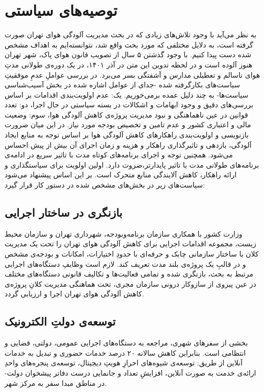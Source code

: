\documentclass[12pt]{atu}
\begin{document}
\section{توصیه‌های سیاستی}
به نظر می‌آید با وجود تلاش‌های زیادی که در بحث مدیریت آلودگی هوای تهران صورت گرفته است، به دلایل مختلفی که مورد بحث واقع شد، نتوانسته‌ایم به اهداف مشخص شده دست‌ پیدا کنیم. با وجود گذشتن ۵ سال از تصویب قانون هوای پاک، شهر تهران هنوز آلوده است و در لحظه تدوین این متن در آذر ۱۴۰۱، در یک دوره‌ی طولانی مدتِ هوای ناسالم و تعطیلی مدارس و آشفتگی بسر می‌برد. در بررسی عواملِ عدمِ موفقیتِ سیاست‌های بکارگرفته شده -جدای از عوامل اشاره شده در بخش آسیب‌شناسی سیاست‌ها- به چند دلیل عمده برمی‌خوریم. یک: عدم اولویت‌بندی اقدامات بر اساس بررسی‌های دقیق و وجود ابهامات و اشکالات در بسته‌ سیاستی در حال اجرا، دو:  تعدد قوانین در عین ناهماهنگی و نبود مدیریت پروژه‌ی کاهش آلودگی هوا، سوم: وضعیت مالی و اعتباری کشور و عدم تامین و تخصیص بودجه مورد نیاز.
در این میان ضرورت بازنویسی و اولویت‌بندی راهکارهای کاهش آلودگی هوا بر اساس توجه به  منابع ایجاد آلودگی، بازدهی و تاثیرگذاری راهکار و هزینه و زمان اجرای آن بیش از پیش احساس می‌شود. همچنین توجه و اجرای برنامه‌های کوتاه  مدت با تاثیر سریع در ادامه‌ی برنامه‌های طولانی مدت با تاثیر پایدارتر،ضروت دارد.
اولین اولویت برای سیاستگذاری و ارائه راهکار، کاهش آلایندگی منابع متحرک است.  بر این اساس پیشنهاد می‌شود سیاست‌های زیر در بخش‌های مشخص شده در دستور کار قرار گیرد:
\subsection{بازنگری در ساختار اجرایی}
وزارت کشور با همکاری سازمان برنامه‌و‌بودجه، شهرداری تهران و سازمان محیط زیست، مجموعه اقدامات اجرایی برای کاهش آلودگی هوای تهران را تحت یک مدیریت کلان با ساختار سازمانی چابک و حرفه‌ای با حدودِ اختیارات، امکانات و بودجه‌ی مشخص و در قالبِ یک پروژه‌ی بلند مدت تعریف کند. 
لازم است وظایفِ دستگاه‌های اجرایی مرتبط به بحث، بازنگری شده و تمامی فعالیت‌ها و تکالیف قانونی دستگاه‌های مختلف در عین پیروی از سازوکار درونی سازمان مجری، تحت هماهنگی مدیریت کلانِ پروژه‌ی کاهش آلودگی هوای تهران اجرا و ارزیابی گردد.
\subsection{توسعه‌ی دولتِ الکترونیک}
بخشی از‌ سفرهای شهری، مراجعه به دستگاه‌های اجرایی عمومی، دولتی، قضایی و انتظامی است. بنابراین کاهش سالانه ۲۰ درصد خدمات حضوری و تبدیل به خدمات آنلاین از طریق: توسعه‌ی شیوه‌های احرازِ هویتِ دیجیتال، توسعه‌ی پنجره‌های واحدِ ارائه‌ی خدمت به صورت آنلاین، افزایشِ تعداد و جانمایی درست دفاتر پیشخوان دولت- در مناطق مبدا سفر به مرکز شهر.
\end{document}
